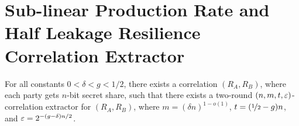 \section{Sub-linear Production Rate and Half Leakage Resilience Correlation Extractor}
	\begin{theorem}
	\label{thm:construction}
	For all constants $0<\delta<g<1/2$, there exists a correlation $(R_A,R_B)$, where each party gets $n$-bit secret share, such that there exists a two-round $(n,m,t,\varepsilon)$-correlation extractor for $(R_A,R_B)$, where $m=(\delta n)^{1-o(1)}$, $t=(\nicefrac12-g)n$, and $\varepsilon=2^{-(g-\delta)n/2}$. 
	\end{theorem}